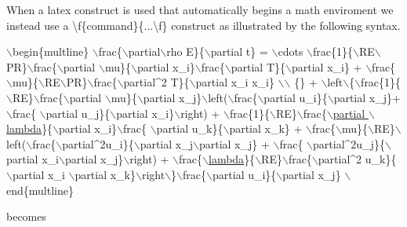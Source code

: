 When a latex construct is used that automatically begins a math enviroment we instead use a \textbackslash{}f\{command\}\{...\textbackslash{}f\} construct as illustrated by the following syntax.


\begin{DoxyCode}
\(\backslash\)begin\{multline\}
\(\backslash\)frac\{\(\backslash\)partial\(\backslash\)rho E\}\{\(\backslash\)partial t\} = \(\backslash\)cdots \(\backslash\)frac\{1\}\{\(\backslash\)RE\(\backslash\)PR\}\(\backslash\)frac\{\(\backslash\)partial \(\backslash\)mu\}\{\(\backslash\)partial x\_i\}\(\backslash\)frac\{\(\backslash\)partial 
      T\}\{\(\backslash\)partial x\_i\} + \(\backslash\)frac\{\(\backslash\)mu\}\{\(\backslash\)RE\(\backslash\)PR\}\(\backslash\)frac\{\(\backslash\)partial^2 T\}\{\(\backslash\)partial x\_i x\_i\} \(\backslash\)\(\backslash\)
\{\} + \(\backslash\)left\(\backslash\)\{\(\backslash\)frac\{1\}\{\(\backslash\)RE\}\(\backslash\)frac\{\(\backslash\)partial \(\backslash\)mu\}\{\(\backslash\)partial x\_j\}\(\backslash\)left(\(\backslash\)frac\{\(\backslash\)partial u\_i\}\{\(\backslash\)partial x\_j\}+\(\backslash\)frac\{
      \(\backslash\)partial u\_j\}\{\(\backslash\)partial x\_i\}\(\backslash\)right) + \(\backslash\)frac\{1\}\{\(\backslash\)RE\}\(\backslash\)frac\{\hyperlink{RoeKernels_8H_a89211c91f7e80725e4791ef58e043244}{\(\backslash\)partial \(\backslash\)lambda}\}\{\(\backslash\)partial x\_i\}\(\backslash\)frac\{
      \(\backslash\)partial u\_k\}\{\(\backslash\)partial x\_k\} + \(\backslash\)frac\{\(\backslash\)mu\}\{\(\backslash\)RE\}\(\backslash\)left(\(\backslash\)frac\{\(\backslash\)partial^2u\_i\}\{\(\backslash\)partial x\_j\(\backslash\)partial x\_j\} + \(\backslash\)frac\{
      \(\backslash\)partial^2u\_j\}\{\(\backslash\)partial x\_i\(\backslash\)partial x\_j\}\(\backslash\)right) + \(\backslash\)frac\{\hyperlink{RoeKernels_8H_a89211c91f7e80725e4791ef58e043244}{\(\backslash\)lambda}\}\{\(\backslash\)RE\}\(\backslash\)frac\{\(\backslash\)partial^2 u\_k\}\{\(\backslash\)partial x\_i
       \(\backslash\)partial x\_k\}\(\backslash\)right\(\backslash\)\}\(\backslash\)frac\{\(\backslash\)partial u\_i\}\{\(\backslash\)partial x\_j\}
\(\backslash\)end\{multline\}
\end{DoxyCode}


becomes



